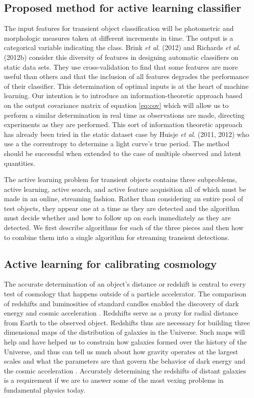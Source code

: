 \documentclass[useAMS,usenatbib,tightenlines,11pt,preprint]{aastex}
\begin{document}
\subsection{Proposed method for active learning classifier}

The input features for transient object classification will be photometric
and morphologic measures taken at different increments in time.  The output
is a categorical variable indicating the class.
Brink {\it et al}. (2012) and Richards {\it et al}. (2012b) consider this
diversity of features in designing automatic classifiers on static data sets. 
They use cross-validation to
find that some features are more useful than others and that the inclusion
of all features degrades the performance of their classifier.  This
determination of optimal inputs is at the heart of machine learning.  Our
intention is to introduce an information-theoretic approach 
based on the output covariance matrix of equation \ref{eq:cov} which will allow
us to perform a similar determination in real time as observations are made,
directing experiments as they are performed.  This sort of information theoretic
approach has already been tried in the static dataset case by Huisje {\it et al}. 
(2011, 2012) who use a the correntropy to determine a light curve's 
true period.  The method should be successful when extended to the case of
multiple observed and latent quantities.

The active learning problem for transient objects contains three
subproblems, active learning, active search, and active feature
acquisition all of which must be made in an online, streaming fashion.  
Rather than
considering an entire pool of test objects, they appear one at a time as
they are detected and the algorithm must decide whether and how to follow
up on each immediately as they are detected.  We first describe algorithms
for each of the three pieces and then how to combine them into a single
algorithm for streaming transient detections.


\subsection{Active learning for calibrating cosmology}
\label{sec:photoz}

The accurate determination of an object's distance or redshift is
central to every test of cosmology that happens outside of a particle
accelerator.  The comparison of redshifts and luminosities of standard
candles enabled the discovery of dark energy and cosmic acceleration
\cite{perlmutter1998}. Redshifts serve as a proxy for radial distance
from Earth to the observed object.  Redshifts thus are necessary for
building three dimensional maps of the distribution of galaxies in the
Universe.  Such maps will help and have helped us to constrain how
galaxies formed over the history of the Universe, and thus can tell us
much about how gravity operates at the largest scales and what the
parameters are that govern the behavior of dark energy and the cosmic
acceleration \cite{muvarpi2,roland,sudeep}.  Accurately determining the redshifts of
distant galaxies is a requirement if we are to answer some of the most
vexing problems in fundamental physics today.
\end{document}
